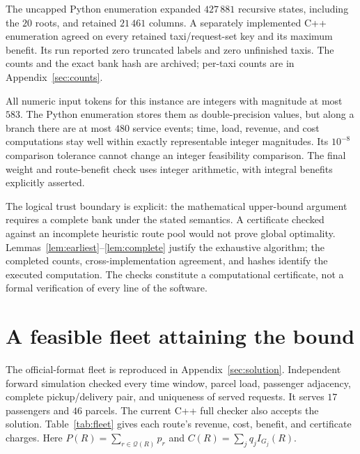 \documentclass[11pt,a4paper]{article}
\newcommand{\Q}{\mathcal Q}
\begin{document}
The uncapped Python enumeration expanded $427\,881$ recursive states,
including the $20$ roots, and retained $21\,461$ columns. A separately
implemented C++ enumeration agreed on every retained taxi/request-set key
and its maximum benefit. Its run reported zero truncated labels and zero
unfinished taxis. The counts and the exact bank hash are archived; per-taxi
counts are in Appendix~\ref{sec:counts}.

All numeric input tokens for this instance are integers with magnitude at
most $583$. The Python enumeration stores them as double-precision values,
but along a branch there are at most $480$ service events; time, load,
revenue, and cost computations stay well within exactly representable
integer magnitudes. Its $10^{-8}$ comparison tolerance cannot change an
integer feasibility comparison. The final weight and route-benefit check
uses integer arithmetic, with integral benefits explicitly asserted.

The logical trust boundary is explicit: the mathematical upper-bound
argument requires a complete bank under the stated semantics. A certificate
checked against an incomplete heuristic route pool would not prove global
optimality. Lemmas~\ref{lem:earliest}--\ref{lem:complete} justify the exhaustive
algorithm; the completed counts, cross-implementation agreement, and hashes
identify the executed computation. The checks constitute a computational
certificate, not a formal verification of every line of the software.

\section{A feasible fleet attaining the bound}\label{sec:lower}

The official-format fleet is reproduced in Appendix~\ref{sec:solution}.
Independent forward simulation checked every time window, parcel load,
passenger adjacency, complete pickup/delivery pair, and uniqueness of served
requests. It serves $17$ passengers and $46$ parcels. The current C++ full
checker also accepts the solution. Table~\ref{tab:fleet} gives each route's
revenue, cost, benefit, and certificate charges. Here
$P(R)=\sum_{r\in\Q(R)}p_r$ and
$C(R)=\sum_jq_j I_{G_j}(R)$.
\end{document}
